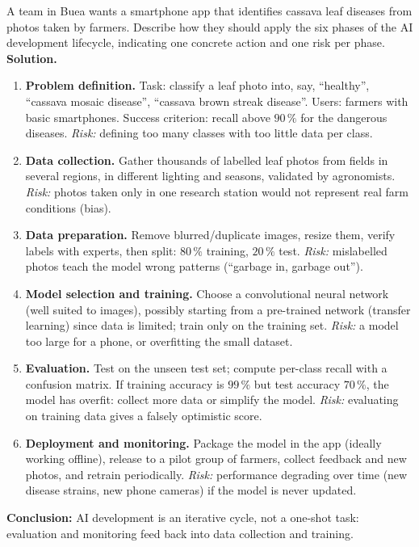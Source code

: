 \documentclass[11pt]{article}
\begin{document}
\begin{exoresolu}
A team in Buea wants a smartphone app that identifies cassava leaf diseases from photos taken by farmers. Describe how they should apply the six phases of the AI development lifecycle, indicating one concrete action and one risk per phase.
\tcblower
\textbf{Solution.}
\begin{enumerate}
\item \textbf{Problem definition.} Task: classify a leaf photo into, say, ``healthy'', ``cassava mosaic disease'', ``cassava brown streak disease''. Users: farmers with basic smartphones. Success criterion: recall above $90\,\%$ for the dangerous diseases. \emph{Risk:} defining too many classes with too little data per class.
\item \textbf{Data collection.} Gather thousands of labelled leaf photos from fields in several regions, in different lighting and seasons, validated by agronomists. \emph{Risk:} photos taken only in one research station would not represent real farm conditions (bias).
\item \textbf{Data preparation.} Remove blurred/duplicate images, resize them, verify labels with experts, then split: $80\,\%$ training, $20\,\%$ test. \emph{Risk:} mislabelled photos teach the model wrong patterns (``garbage in, garbage out'').
\item \textbf{Model selection and training.} Choose a convolutional neural network (well suited to images), possibly starting from a pre-trained network (transfer learning) since data is limited; train only on the training set. \emph{Risk:} a model too large for a phone, or overfitting the small dataset.
\item \textbf{Evaluation.} Test on the unseen test set; compute per-class recall with a confusion matrix. If training accuracy is $99\,\%$ but test accuracy $70\,\%$, the model has overfit: collect more data or simplify the model. \emph{Risk:} evaluating on training data gives a falsely optimistic score.
\item \textbf{Deployment and monitoring.} Package the model in the app (ideally working offline), release to a pilot group of farmers, collect feedback and new photos, and retrain periodically. \emph{Risk:} performance degrading over time (new disease strains, new phone cameras) if the model is never updated.
\end{enumerate}
\textbf{Conclusion:} AI development is an iterative cycle, not a one-shot task: evaluation and monitoring feed back into data collection and training.
\end{exoresolu}
\end{document}
